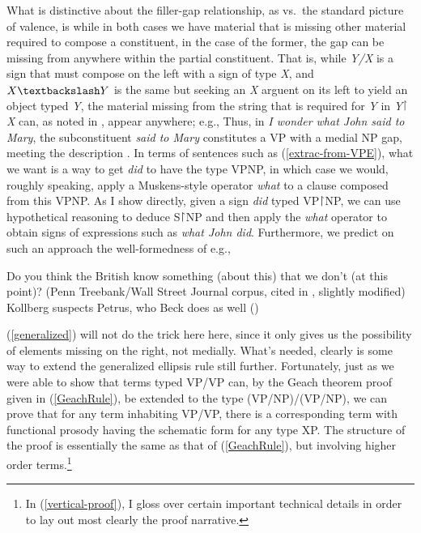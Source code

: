 \documentclass[output=paper,colorlinks,citecolor=brown]{langscibook}
\begin{document}
What is distinctive about the filler-gap relationship, as vs.\  the
standard picture of valence, is while in both cases we have material
that is missing other material required to compose a constituent, in
the case of the former, the gap can be missing from anywhere within
the partial constituent. That is, while \textit{Y/X} is a sign that must
compose on the left with a sign of type \textit{X}, and $X\bsl Y$ is the same
but seeking an \textit{X} arguent on its left to yield an object typed \textit{Y},
the material missing from the string that is required for \textit{Y} in
\textit{Y}\ensuremath{\vs}\textit{X} can, as noted in , appear
anywhere; e.g., Thus, in \textit{I wonder what John said to Mary}, the
subconstituent \textit{said {\gp}\xspace to Mary} constitutes a VP with a medial NP
gap, meeting the description . In terms of sentences such as
(\ref{extrac-from-VPE}), what we want is a way to get \textit{did} to have the type
VP\vs NP, in which case we would, roughly speaking, apply a Muskens-style
operator \textit{what} to a clause composed from this VP\vs NP. As I show
directly, given a sign \textit{did} typed VP\ensuremath{\vs}NP, we can use hypothetical
reasoning to deduce S\ensuremath{\vs}NP and then apply the \textit{what} operator to obtain
signs of expressions such as \textit{what John did}. Furthermore, we predict
on such an approach the well-formedness of e.g.,

\begin{exe}
 \ex\label{internal}
  \begin{xlist}
 \ex\label{}
    Do you think the British know something (about this) that we don't
(at this point)? (Penn Treebank/Wall Street Journal corpus, cited in
\citet{bos-spenader2011}, slightly modified)
 \ex\label{}
    Kollberg suspects Petrus, who Beck does {\gp}\xspace as well (\citet[666]{kennedy1995})
  \end{xlist}
\end{exe}
(\ref{generalized}) will not do the trick here here, since it only gives us
the possibility of elements missing on the right, not medially. What's
needed, clearly is some way to extend the generalized ellipsis rule
still further. Fortunately, just as we were able to show that terms
typed VP/VP can, by the Geach theorem proof given in (\ref{GeachRule}), be
extended to the type (VP/NP)/(VP/NP), we can prove that for any term
inhabiting VP/VP, there is a corresponding term with functional
prosody having the schematic form  for any type XP.
The structure of the proof is essentially the same as that of
(\ref{GeachRule}), but involving higher order terms.\footnote{In
(\ref{vertical-proof}), I gloss over certain important technical details in
order to lay out most clearly the proof narrative.}
\end{document}
